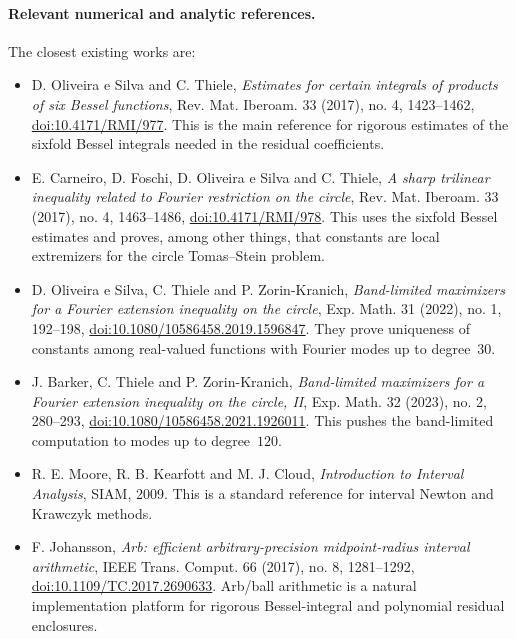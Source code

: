 \documentclass[12pt]{article}
\theoremstyle{definition}
\theoremstyle{remark}
\begin{document}
\paragraph{Relevant numerical and analytic references.}
The closest existing works are:
\begin{itemize}[leftmargin=2em]
  \item D. Oliveira e Silva and C. Thiele,
    \emph{Estimates for certain integrals of products of six Bessel
    functions}, Rev. Mat. Iberoam. 33 (2017), no. 4, 1423--1462,
    \href{https://doi.org/10.4171/RMI/977}{doi:10.4171/RMI/977}.
    This is the main reference for rigorous estimates of the sixfold
    Bessel integrals needed in the residual coefficients.
  \item E. Carneiro, D. Foschi, D. Oliveira e Silva and C. Thiele,
    \emph{A sharp trilinear inequality related to Fourier restriction on
    the circle}, Rev. Mat. Iberoam. 33 (2017), no. 4, 1463--1486,
    \href{https://doi.org/10.4171/RMI/978}{doi:10.4171/RMI/978}.
    This uses the sixfold Bessel estimates and proves, among other things,
    that constants are local extremizers for the circle Tomas--Stein
    problem.
  \item D. Oliveira e Silva, C. Thiele and P. Zorin-Kranich,
    \emph{Band-limited maximizers for a Fourier extension inequality on
    the circle}, Exp. Math. 31 (2022), no. 1, 192--198,
    \href{https://doi.org/10.1080/10586458.2019.1596847}
    {doi:10.1080/10586458.2019.1596847}.  They prove uniqueness of
    constants among real-valued functions with Fourier modes up to
    degree~$30$.
  \item J. Barker, C. Thiele and P. Zorin-Kranich,
    \emph{Band-limited maximizers for a Fourier extension inequality on
    the circle, II}, Exp. Math. 32 (2023), no. 2, 280--293,
    \href{https://doi.org/10.1080/10586458.2021.1926011}
    {doi:10.1080/10586458.2021.1926011}.  This pushes the band-limited
    computation to modes up to degree~$120$.
  \item R. E. Moore, R. B. Kearfott and M. J. Cloud,
    \emph{Introduction to Interval Analysis}, SIAM, 2009.  This is a
    standard reference for interval Newton and Krawczyk methods.
  \item F. Johansson, \emph{Arb: efficient arbitrary-precision
    midpoint-radius interval arithmetic}, IEEE Trans. Comput. 66 (2017),
    no. 8, 1281--1292,
    \href{https://doi.org/10.1109/TC.2017.2690633}
    {doi:10.1109/TC.2017.2690633}.  Arb/ball arithmetic is a natural
    implementation platform for rigorous Bessel-integral and polynomial
    residual enclosures.
\end{itemize}
\end{document}
